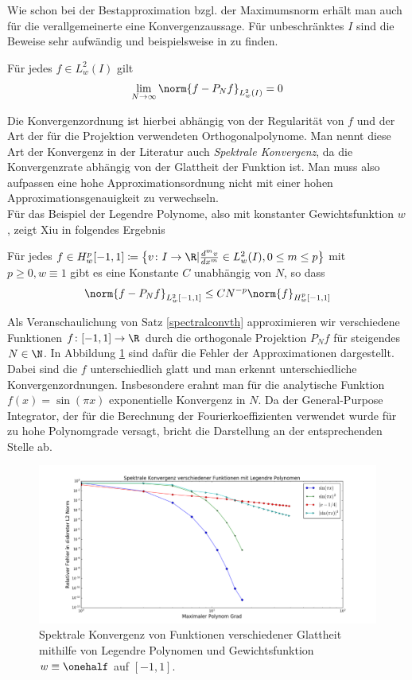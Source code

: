 Wie schon bei der Bestapproximation bzgl. der Maximumsnorm erhält man auch für die verallgemeinerte eine Konvergenzaussage. Für unbeschränktes $I$ sind die Beweise sehr aufwändig und beispielsweise in \autocite{CouHil53} zu finden. 
\begin{maththeorem}
Für jedes $f\in L_w^2(I)$ gilt
\[\lim\limits_{N\to\infty}\norm{f-P_Nf}_{L_w^2(I)}=0\]
\end{maththeorem}
Die Konvergenzordnung ist hierbei abhängig von der Regularität von $f$ und der Art der für die Projektion verwendeten Orthogonalpolynome. Man nennt diese Art der Konvergenz in der Literatur auch \emph{Spektrale Konvergenz}, da die Konvergenzrate abhängig von der Glattheit der Funktion ist. Man muss also aufpassen eine hohe Approximationsordnung nicht mit einer hohen Approximationsgenauigkeit zu verwechseln.\\
Für das Beispiel der Legendre Polynome, also mit konstanter Gewichtsfunktion $w$, zeigt Xiu in \autocite[Theorem 3.6]{dongbinxiu2010} folgendes Ergebnis
\begin{maththeorem}
\label{spectralconvth}
Für jedes $f\in H_w^p[-1,1]\coloneqq \left\lbrace v\colon I\to\R | \frac{d^mv}{dx^m}\in L_w^2(I),0\le m\le p\right\rbrace$ mit $p\ge 0, w\equiv 1$ gibt es eine Konstante $C$ unabhängig von $N$, so dass
\[\norm{f-P_Nf}_{L_w^2[-1,1]}\le CN^{-p}\norm{f}_{H_w^p[-1,1]}\]
\end{maththeorem}
\begin{mathbsp}
Als Veranschaulichung von Satz \ref{spectralconvth} approximieren wir verschiedene Funktionen $f\colon [-1,1]\to\R$ durch die orthogonale Projektion $P_Nf$ für steigendes $N\in\N$. In Abbildung \ref{figurespectralconverg} sind dafür die Fehler der Approximationen dargestellt. Dabei sind die $f$ unterschiedlich glatt und man erkennt unterschiedliche Konvergenzordnungen. Insbesondere erahnt man für die analytische Funktion $f(x)=\sin(\pi x)$ exponentielle Konvergenz in $N$. Da der General-Purpose Integrator, der für die Berechnung der Fourierkoeffizienten verwendet wurde für zu hohe Polynomgrade versagt, bricht die Darstellung an der entsprechenden Stelle ab.
\begin{figure}[h]
\includegraphics[width=\textwidth]{Figures/spectral_convergence_legendre.png}
\caption{Spektrale Konvergenz von Funktionen verschiedener Glattheit mithilfe von Legendre Polynomen und Gewichtsfunktion $w\equiv \onehalf$ auf $[-1,1]$.}
\label{figurespectralconverg}
\end{figure}
\end{mathbsp}
